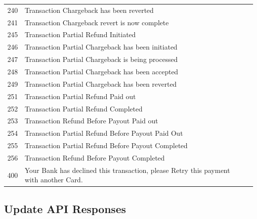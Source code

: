 \documentclass{article}
\newcommand{\cmark}{\ding{51}}
\newcommand{\xmark}{\ding{55}}
\begin{document}
\begin{longtable}{||c|p{7.5cm}||c||c||}
240 &Transaction Chargeback has been reverted& \textcolor{green} {\cmark} & \textcolor{red} {\xmark}  \\
241 &Transaction Chargeback revert is now complete& \textcolor{green} {\cmark} & \textcolor{red} {\xmark}  \\
245 &Transaction Partial Refund Initiated& \textcolor{green}{\cmark} & \textcolor{green}{\cmark} \\
246 &Transaction Partial Chargeback has been initiated& \textcolor{green}{\cmark} & \textcolor{green}{\cmark} \\
247 &Transaction Partial Chargeback is being processed& \textcolor{green}{\cmark} & \textcolor{green}{\cmark} \\
248 &Transaction Partial Chargeback has been accepted& \textcolor{green}{\cmark} & \textcolor{green}{\cmark} \\
249 &Transaction Partial Chargeback has been reverted& \textcolor{green}{\cmark} & \textcolor{green}{\cmark} \\
251 &Transaction Partial Refund Paid out& \textcolor{green}{\cmark} & \textcolor{green}{\cmark} \\
252 &Transaction Partial Refund Completed& \textcolor{green}{\cmark} & \textcolor{green}{\cmark} \\
253 &Transaction Refund Before Payout Paid out& \textcolor{green}{\cmark} & \textcolor{green}{\cmark} \\
254 &Transaction Partial Refund Before Payout Paid Out& \textcolor{green}{\cmark} & \textcolor{green}{\cmark} \\
255 &Transaction Partial Refund Before Payout Completed& \textcolor{green}{\cmark} & \textcolor{green}{\cmark} \\
256 &Transaction Refund Before Payout Completed& \textcolor{green}{\cmark} & \textcolor{red}{\xmark} \\
400 &Your Bank has declined this transaction, please Retry this payment with another Card.& \textcolor{red}{\xmark} & \textcolor{red}{\xmark} \\
\end{longtable}

\newpage
\subsection{Update API Responses}
\end{document}
